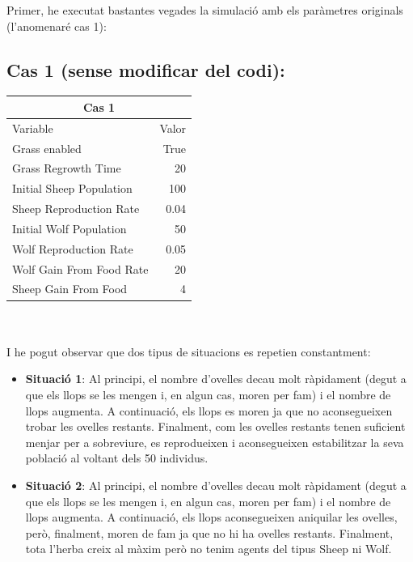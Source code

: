 \documentclass{article} %
\begin{document}
{\color{blue}
	Primer, he executat bastantes vegades la simulació amb els paràmetres originals (l'anomenaré cas 1): \\

	\subsection*{Cas 1 (sense modificar del codi):}
	{\selectfont\small
	\begin{tabular}{l | r}
		\multicolumn{2}{c}{Cas 1}  \\ \hline
		Variable & Valor \\ \hline
		Grass enabled &  True  \\
		Grass Regrowth Time &  20  \\
		Initial Sheep Population &  100  \\
		Sheep Reproduction Rate &  0.04  \\
		Initial Wolf Population &  50  \\
		Wolf Reproduction Rate &  0.05  \\
		Wolf Gain From Food Rate &  20  \\
		Sheep Gain From Food &  4  \\
	\end{tabular}
	} \\ \\

	I he pogut observar que dos tipus de situacions es repetien constantment:

	\begin{itemize}
		\item \textbf{Situació 1}: Al principi, el nombre d'ovelles decau molt ràpidament (degut a que els llops se les mengen i, en algun cas, moren per fam) i el nombre de llops augmenta. A continuació, els llops es moren ja que no aconsegueixen trobar les ovelles restants. Finalment, com les ovelles restants tenen suficient menjar per a sobreviure, es reprodueixen i aconsegueixen estabilitzar la seva població al voltant dels 50 individus.
		\item \textbf{Situació 2}: Al principi, el nombre d'ovelles decau molt ràpidament (degut a que els llops se les mengen i, en algun cas, moren per fam) i el nombre de llops augmenta. A continuació, els llops aconsegueixen aniquilar les ovelles, però, finalment, moren de fam ja que no hi ha ovelles restants. Finalment, tota l'herba creix al màxim però no tenim agents del tipus Sheep ni Wolf.
	\end{itemize}

}
\end{document}
